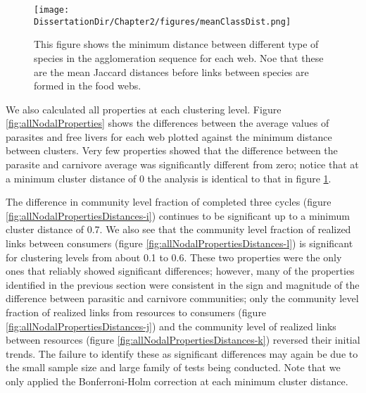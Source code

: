 \documentclass[../dissertation.tex]{subfiles}
\begin{document}
\begin{figure}
    {%
    }%
    \texttt{[image: \\DissertationDir/Chapter2/figures/meanClassDist.png]}

    \caption{This figure shows the minimum distance between different type of
        species in the agglomeration sequence for each web. Noe that these
        are the mean Jaccard distances before links between species are formed
        in the food webs.
    \label{fig:initialNodalProperties}}

\end{figure}

We also calculated all properties at each clustering level. Figure
\ref{fig:allNodalProperties} shows the differences between the average values
of parasites and free livers for each web plotted against the minimum distance
between clusters. Very few properties showed that the difference between the parasite and
carnivore average was significantly different from zero; notice that at a
minimum cluster distance of 0 the analysis is identical to that in
figure \ref{fig:initialNodalProperties}. 

The difference in community level fraction of completed three cycles (figure
\ref{fig:allNodalPropertiesDistances-i}) continues to be significant up to a
minimum cluster distance of 0.7. We also see that the community level fraction
of realized links between consumers (figure
\ref{fig:allNodalPropertiesDistances-l}) is significant for clustering levels
from about 0.1 to 0.6. These two properties were the only ones that reliably
showed significant differences; however, many of the properties identified in
the previous section were consistent in the sign and magnitude of the
difference between parasitic and carnivore communities; only the community
level fraction of realized links from resources to consumers (figure
\ref{fig:allNodalPropertiesDistances-j}) and the community level of realized
links between resources (figure \ref{fig:allNodalPropertiesDistances-k})
reversed their initial trends. The failure to identify these as significant
differences may again be due to the small sample size and large family of tests
being conducted. Note that we only applied the Bonferroni-Holm correction at
each minimum cluster distance.
\end{document}

